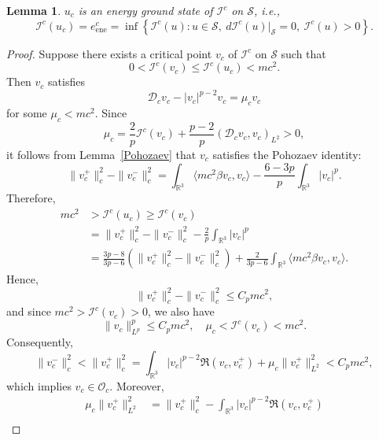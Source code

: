 \documentclass{amsart}
\theoremstyle{plain}
\newtheorem{lemma}[theorem]{Lemma}
\theoremstyle{definition}
\theoremstyle{remark}
\numberwithin{equation}{section} \numberwithin{figure}{section}
\begin{document}
     \begin{lemma}
     \( u_c \) is an energy ground state of \( \mathcal{I}^c \) on \( \mathcal{S} \), i.e.,
      \[
      \mathcal{I}^{c}(u_c) = e_{\mathrm{ene}}^c = \inf \left\{ \mathcal{I}^{c}(u) : u \in \mathcal{S},\ d\mathcal{I}^{c}(u)|_{\mathcal{S}} = 0,\ \mathcal{I}^{c}(u) > 0 \right\}.
      \]
  \end{lemma}
  
  \begin{proof}
      Suppose there exists a critical point \( v_c \) of \( \mathcal{I}^c \) on \( \mathcal{S} \) such that
      \[
      0 < \mathcal{I}^c(v_c) \leq \mathcal{I}^c(u_c) < m c^2.
      \]
      Then \( v_c \) satisfies
      \[
      \mathscr{D}_{c} v_c - |v_c|^{p-2}v_c = \mu_c v_c
      \]
      for some \( \mu_c < m c^2 \). Since
      \[
      \mu_c = \frac{2}{p} \mathcal{I}^c(v_c) + \frac{p-2}{p} (\mathscr{D}_c v_c, v_c)_{L^2} > 0,
      \]
      it follows from Lemma~\ref{Pohozaev} that \( v_c \) satisfies the Pohozaev identity:
      \begin{equation}
          \|v_c^+\|_c^2 - \|v_c^-\|_c^2 = \int_{\mathbb{R}^3} \langle m c^2 \beta v_c, v_c \rangle - \frac{6 - 3p}{p} \int_{\mathbb{R}^3} |v_c|^p.
      \end{equation}
      Therefore,
      \begin{equation}
          \begin{split}
              m c^2 &> \mathcal{I}^c(u_c) \geq \mathcal{I}^c(v_c) \\
              &= \|v_c^+\|_c^2 - \|v_c^-\|_c^2 - \frac{2}{p} \int_{\mathbb{R}^3} |v_c|^p \\
              &= \frac{3p - 8}{3p - 6} (\|v_c^+\|_c^2 - \|v_c^-\|_c^2) + \frac{2}{3p - 6} \int_{\mathbb{R}^3} \langle m c^2 \beta v_c, v_c \rangle.
          \end{split}
      \end{equation}
      Hence,
      \[
      \|v_c^+\|_c^2 - \|v_c^-\|_c^2 \leq C_p m c^2,
      \]
      and since \( m c^2 > \mathcal{I}^c(v_c) > 0 \), we also have
      \[
      \|v_c\|_{L^p}^p \leq C_p m c^2, \quad \mu_c < \mathcal{I}^c(v_c) < m c^2.
      \]
      Consequently,
      \[
      \|v_c^-\|_c^2 < \|v_c^+\|_c^2 = \int_{\mathbb{R}^3} |v_c|^{p-2} \Re(v_c, v_c^+) + \mu_c \|v_c^+\|_{L^2}^2 < C_p m c^2,
      \]
      which implies \( v_c \in \mathcal{O}_c \). Moreover,
      \begin{equation}\label{az}
          \begin{split}
              \mu_c \|v_c^+\|_{L^2}^2 &= \|v_c^+\|_c^2 - \int_{\mathbb{R}^3} |v_c|^{p-2} \Re(v_c, v_c^+) \\

\end{split}
\end{equation}
\end{proof}
\end{document}

